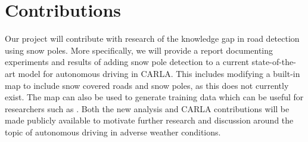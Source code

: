 \section*{Contributions}
Our project will contribute with research of the knowledge gap in road detection using snow poles. More specifically, we will provide a report documenting experiments and results of adding snow pole detection to a current state-of-the-art model for autonomous driving in CARLA. This includes modifying a built-in map to include snow covered roads and snow poles, as this does not currently exist. The map can also be used to generate training data which can be useful for researchers such as \cite{Autonomous-Steering-in-Adverse-Road-and-Weather-Conditions}. Both the new analysis and CARLA contributions will be made publicly available to motivate further research and discussion around the topic of autonomous driving in adverse weather conditions.


\begin{comment}
10%
- C6: The deliverables of the research study are clearly stated.
    This point is simply related to what you will deliver
    from your research. Are we talking about a report? A
    design concept? A product? A scientific paper?
- C7: The new knowledge resulting from the deliverables is clearly described related to the knowledge gap and addresses
the research questions.

Contributions:
- Snow map in CARLA
- Snow poles in CARLA
- If snow poles can be recognized by sensors in autonomous vehicles
- If snow poles can help with navigation
\end{comment}